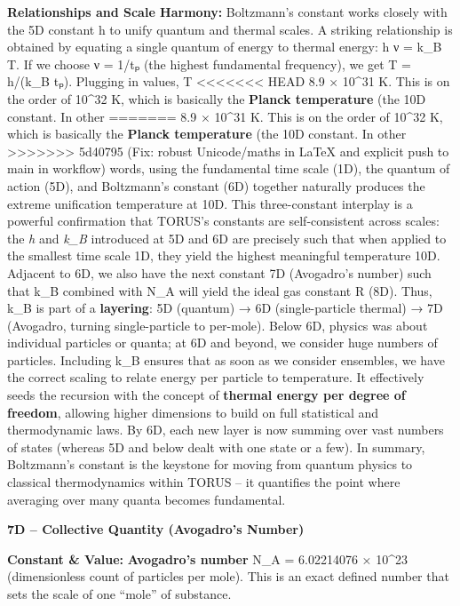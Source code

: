 \documentclass[]{article}
\begin{document}
\textbf{Relationships and Scale Harmony:} Boltzmann's constant works
closely with the 5D constant h to unify quantum and thermal scales. A
striking relationship is obtained by equating a single quantum of energy
to thermal energy: h ν = k\_B T. If we choose ν = 1/tₚ (the highest
fundamental frequency), we get T = h/(k\_B tₚ). Plugging in values, T \approx
<<<<<<< HEAD
8.9 × 10\^{}31 K\hspace{0pt}. This is on the order of 10\^{}32 K, which
is basically the \textbf{Planck temperature} (the 10D constant. In other
=======
8.9 × 10\^{}31 K​. This is on the order of 10\^{}32 K, which is
basically the \textbf{Planck temperature} (the 10D constant. In other
>>>>>>> 5d40795 (Fix: robust Unicode/maths in LaTeX and explicit push to main in workflow)
words, using the fundamental time scale (1D), the quantum of action
(5D), and Boltzmann's constant (6D) together naturally produces the
extreme unification temperature at 10D. This three-constant interplay is
a powerful confirmation that TORUS's constants are self-consistent
across scales: the \emph{h} and \emph{k\_B} introduced at 5D and 6D are
precisely such that when applied to the smallest time scale 1D, they
yield the highest meaningful temperature 10D​. Adjacent to 6D, we also
have the next constant 7D (Avogadro's number) such that k\_B combined
with N\_A will yield the ideal gas constant R (8D)​. Thus, k\_B is part
of a \textbf{layering}: 5D (quantum) → 6D (single-particle thermal) → 7D
(Avogadro, turning single-particle to per-mole). Below 6D, physics was
about individual particles or quanta; at 6D and beyond, we consider huge
numbers of particles. Including k\_B ensures that as soon as we consider
ensembles, we have the correct scaling to relate energy per particle to
temperature. It effectively seeds the recursion with the concept of
\textbf{thermal energy per degree of freedom}, allowing higher
dimensions to build on full statistical and thermodynamic laws. By 6D,
each new layer is now summing over vast numbers of states (whereas 5D
and below dealt with one state or a few). In summary, Boltzmann's
constant is the keystone for moving from quantum physics to classical
thermodynamics within TORUS -- it quantifies the point where averaging
over many quanta becomes fundamental.

\textbf{7D -- Collective Quantity (Avogadro's Number)}

\textbf{Constant \& Value:} \textbf{Avogadro's number} N\_A = 6.02214076
× 10\^{}23 (dimensionless count of particles per mole)​. This is an
exact defined number that sets the scale of one ``mole'' of substance.
\end{document}
